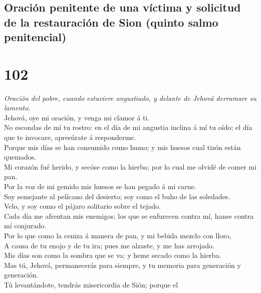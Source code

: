 \hypertarget{oraciuxf3n-penitente-de-una-vuxedctima-y-solicitud-de-la-restauraciuxf3n-de-sion-quinto-salmo-penitencial}{%
\subsection{Oración penitente de una víctima y solicitud de la
restauración de Sion (quinto salmo
penitencial)}\label{oraciuxf3n-penitente-de-una-vuxedctima-y-solicitud-de-la-restauraciuxf3n-de-sion-quinto-salmo-penitencial}}

\hypertarget{section-101}{%
\section{102}\label{section-101}}

 \emph{Oración del pobre, cuando estuviere angustiado, y
delante de Jehová derramare su lamento.}\\
Jehová, oye mi oración, y venga mi clamor á ti.\\
 No escondas de mí tu rostro: en el día de mi angustia
inclina á mí tu oído; el día que te invocare, apresúrate á
responderme.\\
 Porque mis días se han consumido como humo; y mis huesos
cual tizón están quemados.\\
 Mi corazón fué herido, y secóse como la hierba; por lo cual
me olvidé de comer mi pan.\\
 Por la voz de mi gemido mis huesos se han pegado á mi
carne.\\
 Soy semejante al pelícano del desierto; soy como el buho de
las soledades.\\
 Velo, y soy como el pájaro solitario sobre el tejado.\\
 Cada día me afrentan mis enemigos; los que se enfurecen
contra mí, hanse contra mí conjurado.\\
 Por lo que como la ceniza á manera de pan, y mi bebida
mezclo con lloro,\\
 A causa de tu enojo y de tu ira; pues me alzaste, y me has
arrojado.\\
 Mis días son como la sombra que se va; y heme secado como
la hierba.\\
 Mas tú, Jehová, permanecerás para siempre, y tu memoria
para generación y generación.\\
 Tú levantándote, tendrás misericordia de Sión; porque el
